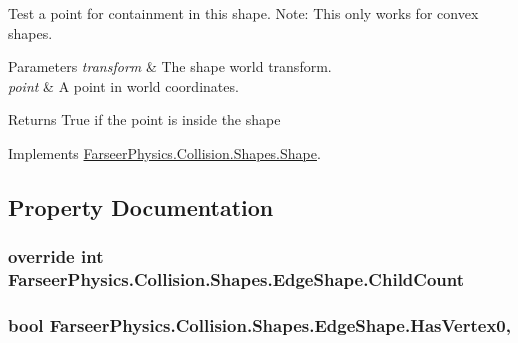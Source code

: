 Test a point for containment in this shape. Note\+: This only works for convex shapes. 


\begin{DoxyParams}{Parameters}
{\em transform} & The shape world transform.\\
\hline
{\em point} & A point in world coordinates.\\
\hline
\end{DoxyParams}
\begin{DoxyReturn}{Returns}
True if the point is inside the shape
\end{DoxyReturn}


Implements \hyperlink{class_farseer_physics_1_1_collision_1_1_shapes_1_1_shape_a2b93a18850e5f40fcc96f2f7744d5d2e}{Farseer\+Physics.\+Collision.\+Shapes.\+Shape}.



\subsection{Property Documentation}
\hypertarget{class_farseer_physics_1_1_collision_1_1_shapes_1_1_edge_shape_a5ba41fb62b70f922e5788da66fc57966}{
\subsubsection[{Child\+Count}]{\setlength{\rightskip}{0pt plus 5cm}override int Farseer\+Physics.\+Collision.\+Shapes.\+Edge\+Shape.\+Child\+Count\hspace{0.3cm}{\ttfamily [get]}}}\label{class_farseer_physics_1_1_collision_1_1_shapes_1_1_edge_shape_a5ba41fb62b70f922e5788da66fc57966}
\hypertarget{class_farseer_physics_1_1_collision_1_1_shapes_1_1_edge_shape_aca9b7fb05abe297942d8138636ec3e6b}{
\subsubsection[{Has\+Vertex0}]{\setlength{\rightskip}{0pt plus 5cm}bool Farseer\+Physics.\+Collision.\+Shapes.\+Edge\+Shape.\+Has\+Vertex0\hspace{0.3cm}{\ttfamily [get]}, {\ttfamily [set]}}}\label{class_farseer_physics_1_1_collision_1_1_shapes_1_1_edge_shape_aca9b7fb05abe297942d8138636ec3e6b}


